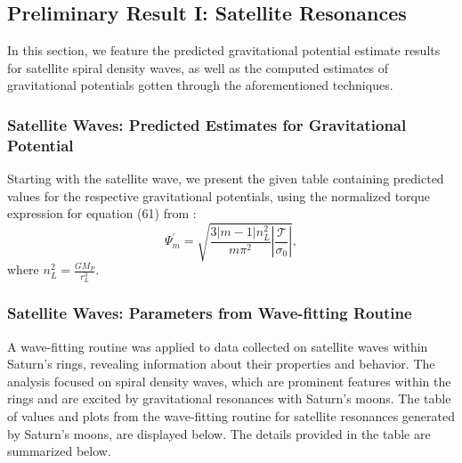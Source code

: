 \documentclass{article}
\begin{document}
\subsection{Preliminary Result I: Satellite Resonances}
In this section, we feature the predicted gravitational potential estimate results for satellite spiral density waves, as well as the computed estimates of gravitational potentials gotten through the aforementioned techniques. 

\subsubsection{Satellite Waves: Predicted Estimates for Gravitational Potential}
Starting with the satellite wave, we present the given table containing predicted values for the respective gravitational potentials, using the normalized torque expression for equation (61) from \cite{Hedman_2022}:
\begin{equation}
    \Psi_{m}^{'} = \sqrt{\frac{3|m - 1|n_{L}^{2}}{m\pi^{2}} \left|\frac{\mathcal{T}}{\sigma_{0}}\right|},
\end{equation}
where $n_{L}^{2} = \frac{G M_{P}}{r_{L}^{3}}$.


\begin{table}
\centering
{}
\caption{Predicted data for spiral density waves excited by Saturn's Satellite resonances.}
\end{table}

\subsubsection{Satellite Waves: Parameters from Wave-fitting Routine}
A wave-fitting routine was applied to data collected on satellite waves within Saturn's rings, revealing information about their properties and behavior. The analysis focused on spiral density waves, which are prominent features within the rings and are excited by gravitational resonances with Saturn's moons. The table of values and plots from the wave-fitting routine for satellite resonances generated by Saturn's moons, are displayed below. The details provided in the table are summarized below.
\end{document}
